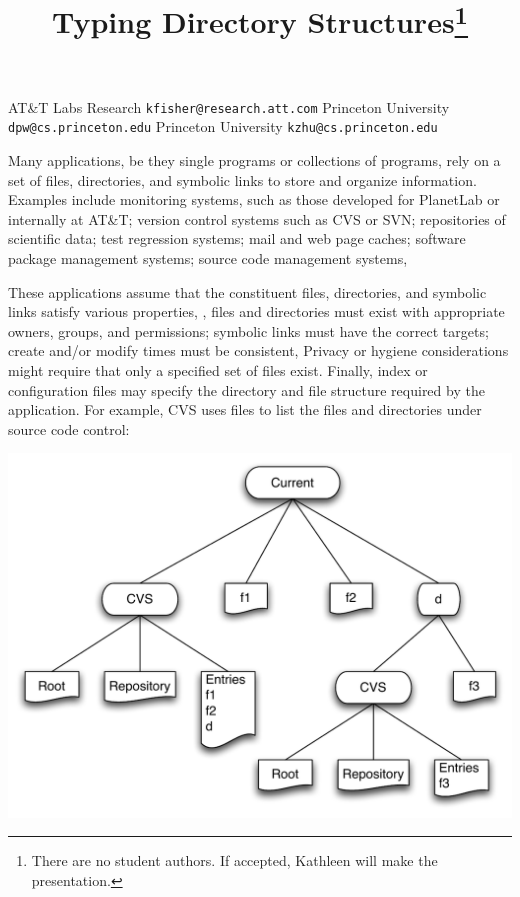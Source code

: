 \documentclass[nocopyrightspace,10pt]{sigplanconf}
\begin{document}
\title{Typing Directory Structures\thanks{There are no student authors.  If
    accepted, Kathleen will make the presentation.}}

	   {AT\&T Labs Research}
           {\small \tt kfisher@research.att.com}
	   {Princeton University}
           {\small \tt dpw@cs.princeton.edu}
	   {Princeton University}
           {\small \tt kzhu@cs.princeton.edu}

\maketitle{}


Many applications, be they single programs or collections of programs,
rely on a set of files, directories, and symbolic links to
store and organize information.  Examples include monitoring
systems, such as those developed for PlanetLab or internally at AT\&T;
version control systems such as CVS or SVN; repositories of scientific
data; test regression systems; mail and web page caches; software
package management systems; source code management systems, \etc{}

These applications assume that the constituent files, directories, and
symbolic links satisfy various properties, \eg{}, files and
directories must exist with appropriate owners, groups, and
permissions; symbolic links must have the correct targets; create
and/or modify times must be consistent, \etc{}  Privacy or hygiene
considerations might require that only a specified set of files exist.
Finally, index or configuration files may specify the directory and
file structure required by the application.  For example, CVS uses 
 files to list the files and directories under source code
control:  

\includegraphics[scale=.4]{CVSStructure.pdf}
\end{document}
